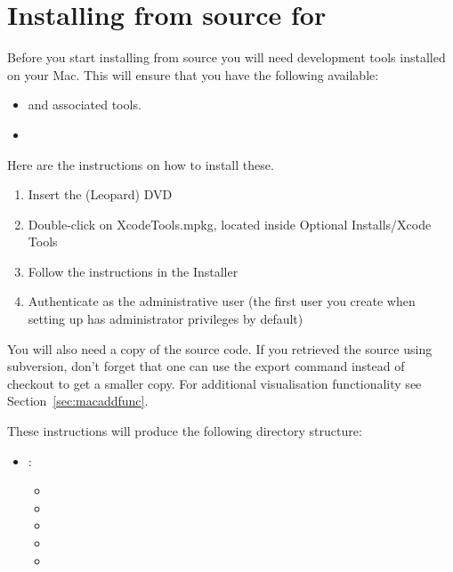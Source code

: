 
%
%
%

\section{Installing from source for \macosx}
\label{sec:srcmac}

Before you start installing from source you will need \macosx development tools installed on your Mac.
This will ensure that you have the following available:
\begin{itemize}
\item {} and associated tools.
\item {}
\end{itemize}

Here are the instructions on how to install these.
\begin{enumerate}
\item Insert the  (Leopard) DVD
\item Double-click on XcodeTools.mpkg, located inside Optional Installs/Xcode Tools
\item Follow the instructions in the Installer
\item Authenticate as the administrative user (the first user you create when setting up \macosx has administrator privileges by default)
\end{enumerate}

You will also need a copy of the \esfinley source code.
If you retrieved the source using subversion, don't forget that one can use the export command instead of checkout to get a smaller copy.
For additional visualisation functionality see Section~\ref{sec:macaddfunc}.

These instructions will produce the following directory structure:
\begin{itemize}
 \item[] : \begin{itemize}
  \item[] 
  \item[] 
  \item[] 
  \item[] 
  \item[] 
 \end{itemize}
\end{itemize}

